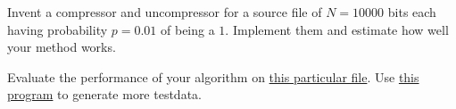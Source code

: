 \documentclass[a4paper,10pt,landscape,twocolumn]{scrartcl}
\begin{document}
\begin{exercise}
Invent a compressor and uncompressor for a source file of $N=10000$
bits each having probability $p=0.01$ of being a $1$. Implement them
and estimate how well your method works.

Evaluate the performance of your algorithm on \href{https://github.com/cschaffner/InformationTheory/raw/master/Problems/random01.txt}{this particular
  file}. Use \href{https://repl.it/@ChrisSchaffner/RandomFile}{this program} to generate more testdata.
\end{exercise}
\end{document}
